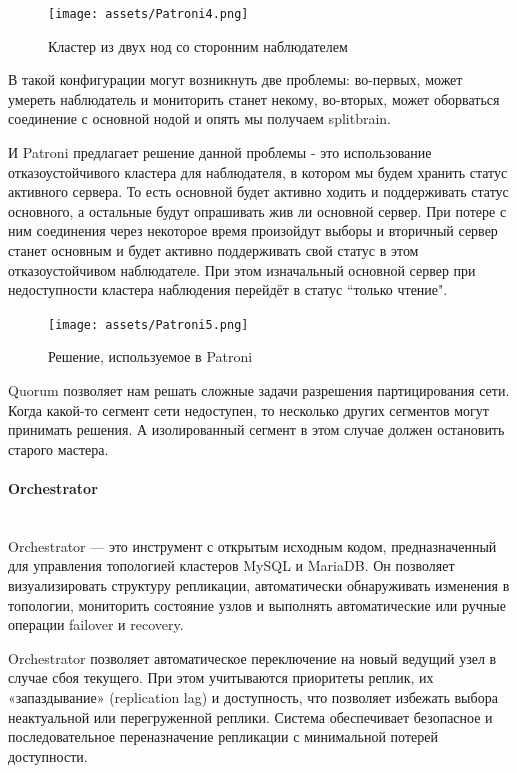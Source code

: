 \begin{figure}[h]
    \centering
    \texttt{[image: assets/Patroni4.png]}
    \caption{Кластер из двух нод со сторонним наблюдателем}
    \label{fig:mesh6}
\end{figure}

В такой конфигурации могут возникнуть две проблемы: во-первых, может умереть наблюдатель и мониторить станет некому, во-вторых, может оборваться соединение с основной нодой и опять мы получаем splitbrain. 

И Patroni предлагает решение данной проблемы - это использование отказоустойчивого кластера для наблюдателя, в котором мы будем хранить статус активного сервера. То есть основной будет активно ходить и поддерживать статус основного, а остальные будут опрашивать жив ли основной сервер. При потере с ним соединения через некоторое время произойдут выборы и вторичный сервер станет основным и будет активно поддерживать свой статус в этом отказоустойчивом наблюдателе. При этом изначальный основной сервер при недоступности кластера наблюдения перейдёт в статус “только чтение".

\begin{figure}[h]
    \centering
    \texttt{[image: assets/Patroni5.png]}
    \caption{Решение, используемое в Patroni}
    \label{fig:mesh7}
\end{figure}

Quorum позволяет нам решать сложные задачи разрешения партицирования сети. Когда какой-то сегмент сети недоступен, то несколько других сегментов могут принимать решения. А изолированный сегмент в этом случае должен остановить старого мастера. 

\paragraph{Orchestrator} ~\\
Orchestrator — это инструмент с открытым исходным кодом, предназначенный для управления топологией кластеров MySQL и MariaDB. Он позволяет визуализировать структуру репликации, автоматически обнаруживать изменения в топологии, мониторить состояние узлов и выполнять автоматические или ручные операции failover и recovery. \autocite{Openarc}

Orchestrator позволяет автоматическое переключение на новый ведущий узел в случае сбоя текущего. При этом учитываются приоритеты реплик, их «запаздывание» (replication lag) и доступность, что позволяет избежать выбора неактуальной или перегруженной реплики. Система обеспечивает безопасное и последовательное переназначение репликации с минимальной потерей доступности.

